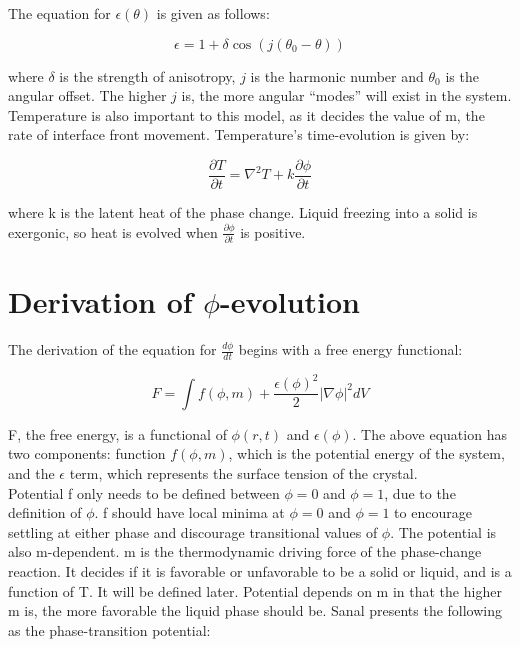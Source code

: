 \documentclass[10pt]{article} %
\begin{document}
The equation for $\epsilon(\theta)$ is given as follows:

\begin{equation}
  \epsilon = 1 + \delta\cos\left(j\left(\theta_0-\theta\right)\right)
\end{equation}

where $\delta$ is the strength of anisotropy, $j$ is the harmonic number and $\theta_0$ is the angular offset. The higher $j$ is, the more angular ``modes'' will exist in the system.\\

Temperature is also important to this model, as it decides the value of m, the rate of interface front movement. Temperature's time-evolution is given by:

\begin{equation}  \label{eq:dTdt}
  \frac{\partial T}{\partial t} = \nabla^2T + k\frac{\partial \phi}{\partial t}
\end{equation}

where k is the latent heat of the phase change. Liquid freezing into a solid is exergonic, so heat is evolved when $\frac{\partial\phi}{\partial t}$ is positive. \\

\section{Derivation of $\phi$-evolution}
The derivation of the equation for $\frac{d\phi}{dt}$ begins with a free energy functional:

\begin{equation}
  F = \int f(\phi,m) + \frac{\epsilon(\phi)^2}{2}|\nabla\phi|^2 dV
\end{equation}

F, the free energy, is a functional of $\phi(r,t)$ and $\epsilon(\phi)$. The above equation has two components: function $f(\phi,m)$, which is the potential energy of the system, and the $\epsilon$ term, which represents the surface tension of the crystal.\\

Potential f only needs to be defined between $\phi=0$ and $\phi=1$, due to the definition of $\phi$. f should have local minima at $\phi=0$ and $\phi=1$ to encourage settling at either phase and discourage transitional values of $\phi$. The potential is also m-dependent. m is the thermodynamic driving force of the phase-change reaction. It decides if it is favorable or unfavorable to be a solid or liquid, and is a function of T. It will be defined later. Potential depends on m in that the higher m is, the more favorable the liquid phase should be. Sanal presents the following as the phase-transition potential:
\end{document}
